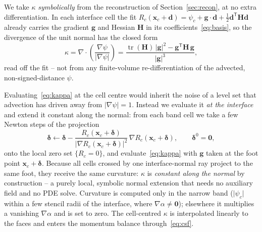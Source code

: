 \documentclass[preprint,3p,11pt]{elsarticle}
\newcommand{\psilev}{\psi}                       %
\newcommand{\xc}{\mathbf{x}_c}                    %
\newcommand{\gradpsi}{\lvert\nabla\psilev\rvert}
\begin{document}
We take $\kappa$ \emph{symbolically} from the reconstruction of Section~\ref{sec:recon}, at
no extra differentiation. In each interface cell the fit $R_c(\xc+\mathbf{d})=\psilev_c+
\mathbf{g}\cdot\mathbf{d}+\tfrac12\mathbf{d}^{\mathsf T}\mathbf{H}\mathbf{d}$ already carries
the gradient $\mathbf{g}$ and Hessian $\mathbf{H}$ in its coefficients~\eqref{eq:basis}, so
the divergence of the unit normal has the closed form
\begin{equation}
  \kappa = \nabla\cdot\!\left(\frac{\nabla\psilev}{\lvert\nabla\psilev\rvert}\right)
         = \frac{\operatorname{tr}(\mathbf{H})\,\lvert\mathbf{g}\rvert^{2}
                 - \mathbf{g}^{\mathsf T}\mathbf{H}\,\mathbf{g}}
                {\lvert\mathbf{g}\rvert^{3}} ,
  \label{eq:kappa}
\end{equation}
read off the fit -- not from any finite-volume re-differentiation of the advected,
non-signed-distance $\psilev$.

Evaluating~\eqref{eq:kappa} at the cell centre would inherit the noise of a level set that
advection has driven away from $\gradpsi=1$. Instead we evaluate it \emph{at the interface}
and extend it constant along the normal: from each band cell we take a few Newton steps of
the projection
\begin{equation}
  \bm{\delta} \leftarrow \bm{\delta}
     - \frac{R_c(\xc+\bm{\delta})}{\lvert\nabla R_c(\xc+\bm{\delta})\rvert^{2}}\,
       \nabla R_c(\xc+\bm{\delta}), \qquad \bm{\delta}^{0}=\mathbf 0,
  \label{eq:footNewton}
\end{equation}
onto the local zero set $\{R_c=0\}$, and evaluate~\eqref{eq:kappa} with $\mathbf{g}$ taken
at the foot point $\xc+\bm{\delta}$. Because all cells crossed by one interface-normal ray
project to the same foot, they receive the same curvature: $\kappa$ is \emph{constant along
the normal} by construction -- a purely local, symbolic normal extension that needs no
auxiliary field and no PDE solve. Curvature is computed only in the narrow band
($\lvert\psilev_c\rvert$ within a few stencil radii of the interface, where
$\nabla\alpha\neq\mathbf 0$); elsewhere it multiplies a vanishing $\nabla\alpha$ and is set
to zero. The cell-centred $\kappa$ is interpolated linearly to the faces and enters the
momentum balance through~\eqref{eq:csf}.
\end{document}
